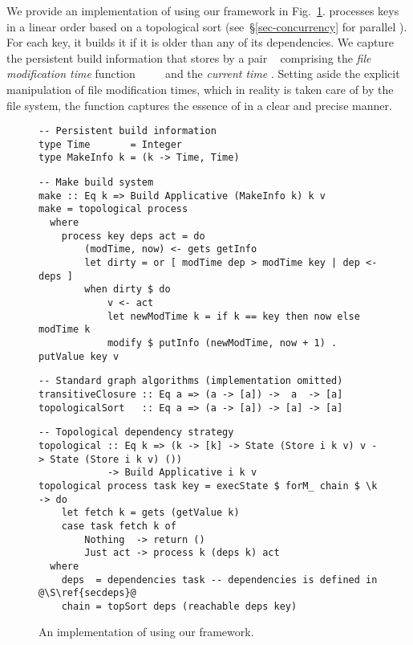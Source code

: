 We provide an implementation of \Make using our framework in
Fig.~\ref{fig-make-implementation}. \Make processes keys in a linear order based
on a topological sort (see~\S\ref{sec-concurrency} for parallel \Make). For
each key, it builds it if it is older than any of its dependencies. We capture
the persistent build information that \Make stores by a pair
~ comprising the \emph{file modification time} function
~\hs{::}~~\hs{->}~ and the \emph{current time} .
Setting aside the explicit manipulation of file modification times, which in
reality is taken care of by the file system, the function  captures
the essence of \Make in a clear and precise manner.

\begin{figure}
\begin{verbatim}
-- Persistent build information
type Time       = Integer
type MakeInfo k = (k -> Time, Time)
\end{verbatim}
\vspace{1mm}
\begin{verbatim}
-- Make build system
make :: Eq k => Build Applicative (MakeInfo k) k v
make = topological process
  where
    process key deps act = do
        (modTime, now) <- gets getInfo
        let dirty = or [ modTime dep > modTime key | dep <- deps ]
        when dirty $ do
            v <- act
            let newModTime k = if k == key then now else modTime k
            modify $ putInfo (newModTime, now + 1) . putValue key v
\end{verbatim}
\vspace{1mm}
\begin{verbatim}
-- Standard graph algorithms (implementation omitted)
transitiveClosure :: Eq a => (a -> [a]) ->  a  -> [a]
topologicalSort   :: Eq a => (a -> [a]) -> [a] -> [a]
\end{verbatim}
\vspace{1mm}
\begin{verbatim}
-- Topological dependency strategy
topological :: Eq k => (k -> [k] -> State (Store i k v) v -> State (Store i k v) ())
            -> Build Applicative i k v
topological process task key = execState $ forM_ chain $ \k -> do
    let fetch k = gets (getValue k)
    case task fetch k of
        Nothing  -> return ()
        Just act -> process k (deps k) act
  where
    deps  = dependencies task -- dependencies is defined in @\S\ref{secdeps}@
    chain = topSort deps (reachable deps key)
\end{verbatim}
\vspace{-2mm}
\caption{An implementation of \Make using our framework.}\label{fig-make-implementation}
\vspace{-2mm}
\end{figure}

